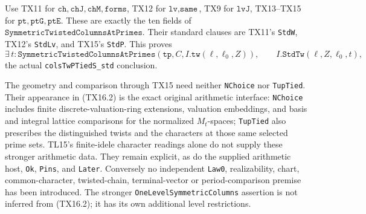 Use TX11 for \(\texttt{ch},\texttt{chJ},\texttt{chM},
\texttt{forms}\), TX12 for \(\texttt{lv},\texttt{same}\),
TX9 for \(\texttt{lvJ}\), TX13--TX15 for
\(\texttt{pt},\texttt{ptG},\texttt{ptE}\).
These are exactly the ten fields of
\(\texttt{SymmetricTwistedColumnsAtPrimes}\).
Their standard clauses are TX11's \texttt{StdW},
TX12's \texttt{StdLv}, and TX15's \texttt{StdP}.
This proves
\[
 \exists\,t:
 \texttt{SymmetricTwistedColumnsAtPrimes}
       (\texttt{tp},C,I.\texttt{tw}(\ell,\ell_0,Z)),
 \qquad I.\texttt{StdTw}(\ell,Z,\ell_0,t),
 \tag{TX16.2}
\]
the actual \texttt{colsTwPTiedS\_std} conclusion.

The geometry and comparison through TX15 need neither
\texttt{NChoice} nor \texttt{TupTied}. Their appearance in
(TX16.2) is the exact original arithmetic interface:
\texttt{NChoice} includes finite discrete-valuation-ring
extensions, valuation embeddings, and basis and integral
lattice comparisons for the normalized \(M_t\)-spaces;
\texttt{TupTied} also prescribes the distinguished twists
and the characters at those same selected prime sets.
TL15's finite-idele character readings alone do not supply
these stronger arithmetic data. They remain explicit,
as do the supplied arithmetic host, \texttt{Ok},
\texttt{Pins}, and \texttt{Later}. Conversely no independent
\texttt{Law0}, realizability, chart, common-character,
twisted-chain, terminal-vector or period-comparison premise
has been introduced. The stronger
\texttt{OneLevelSymmetricColumns} assertion is not inferred
from (TX16.2); it has its own additional level restrictions.
